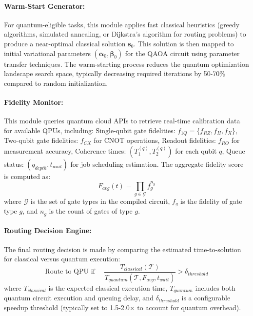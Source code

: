 \documentclass[lettersize,journal]{IEEEtran}
\begin{document}
\paragraph{Warm-Start Generator:}
For quantum-eligible tasks, this module applies fast classical heuristics (greedy algorithms, simulated annealing, or Dijkstra's algorithm for routing problems) to produce a near-optimal classical solution $\mathbf{s}_0$. This solution is then mapped to initial variational parameters $(\boldsymbol{\alpha}_0, \boldsymbol{\beta}_0)$ for the QAOA circuit using parameter transfer techniques. The warm-starting process reduces the quantum optimization landscape search space, typically decreasing required iterations by 50-70\% compared to random initialization.

\paragraph{Fidelity Monitor:}
This module queries quantum cloud APIs to retrieve real-time calibration data for available QPUs, including: Single-qubit gate fidelities: $f_{1Q} = \{f_{RZ}, f_{H}, f_{X}\}$, Two-qubit gate fidelities: $f_{CX}$ for CNOT operations, Readout fidelities: $f_{RO}$ for measurement accuracy, Coherence times: $(T_1^{(q)}, T_2^{(q)})$ for each qubit $q$, Queue status: $(q_{depth}, t_{wait})$ for job scheduling estimation.
The aggregate fidelity score is computed as:
\begin{equation}
F_{avg}(t) = \prod_{g \in \mathcal{G}} f_g^{n_g}
\label{eq:avg_fidelity}
\end{equation}
where $\mathcal{G}$ is the set of gate types in the compiled circuit, $f_g$ is the fidelity of gate type $g$, and $n_g$ is the count of gates of type $g$.

\paragraph{Routing Decision Engine:}
The final routing decision is made by comparing the estimated time-to-solution for classical versus quantum execution:
\begin{equation}
\text{Route to QPU if } \quad \frac{T_{classical}(\mathcal{T})}{T_{quantum}(\mathcal{T}, F_{avg}, t_{wait})} > \delta_{threshold}
\label{eq:routing_decision}
\end{equation}
where $T_{classical}$ is the expected classical execution time, $T_{quantum}$ includes both quantum circuit execution and queuing delay, and $\delta_{threshold}$ is a configurable speedup threshold (typically set to 1.5-2.0× to account for quantum overhead).
\end{document}
